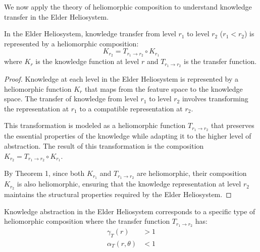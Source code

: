 We now apply the theory of heliomorphic composition to understand knowledge transfer in the Elder Heliosystem.

\begin{theorem}
In the Elder Heliosystem, knowledge transfer from level $r_1$ to level $r_2$ ($r_1 < r_2$) is represented by a heliomorphic composition:
\begin{equation}
K_{r_2} = T_{r_1 \to r_2} \circ K_{r_1}
\end{equation}
where $K_r$ is the knowledge function at level $r$ and $T_{r_1 \to r_2}$ is the transfer function.
\end{theorem}

\begin{proof}
Knowledge at each level in the Elder Heliosystem is represented by a heliomorphic function $K_r$ that maps from the feature space to the knowledge space. The transfer of knowledge from level $r_1$ to level $r_2$ involves transforming the representation at $r_1$ to a compatible representation at $r_2$.

This transformation is modeled as a heliomorphic function $T_{r_1 \to r_2}$ that preserves the essential properties of the knowledge while adapting it to the higher level of abstraction. The result of this transformation is the composition $K_{r_2} = T_{r_1 \to r_2} \circ K_{r_1}$.

By Theorem 1, since both $K_{r_1}$ and $T_{r_1 \to r_2}$ are heliomorphic, their composition $K_{r_2}$ is also heliomorphic, ensuring that the knowledge representation at level $r_2$ maintains the structural properties required by the Elder Heliosystem.
\end{proof}

\begin{theorem}
Knowledge abstraction in the Elder Heliosystem corresponds to a specific type of heliomorphic composition where the transfer function $T_{r_1 \to r_2}$ has:
\begin{align}
\gamma_T(r) &> 1\\
\alpha_T(r,\theta) &< 1
\end{align}
\end{theorem}

